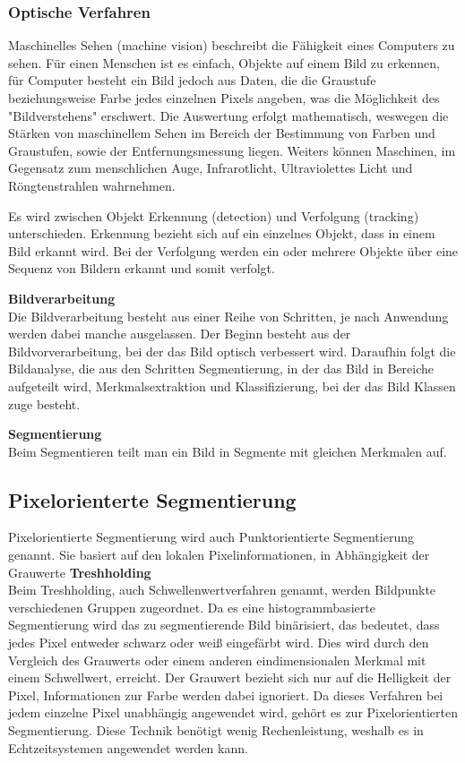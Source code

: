     \subsubsection{Optische Verfahren}
    Maschinelles Sehen (machine vision) beschreibt die Fähigkeit eines Computers zu sehen. 
    Für einen Menschen ist es einfach, Objekte auf einem Bild zu erkennen, für Computer besteht ein Bild jedoch aus Daten, die die Graustufe beziehungsweise Farbe jedes einzelnen Pixels angeben, was die Möglichkeit des "Bildverstehens" erschwert.
    Die Auswertung erfolgt mathematisch, weswegen die Stärken von maschinellem Sehen im Bereich der Bestimmung von Farben und Graustufen, sowie der Entfernungsmessung liegen. Weiters können Maschinen, im Gegensatz zum menschlichen Auge, Infrarotlicht, Ultraviolettes Licht und Röngtenstrahlen wahrnehmen. \cite{machinevision} \cite{machinevision2}

    Es wird zwischen Objekt Erkennung (detection) und Verfolgung (tracking) unterschieden. Erkennung bezieht sich auf ein einzelnes Objekt, dass in einem Bild erkannt wird. Bei der Verfolgung werden ein oder mehrere Objekte über eine Sequenz von Bildern erkannt und somit verfolgt.
    \cite{obj_det_trak}

    \textbf{Bildverarbeitung}\\ 
    Die Bildverarbeitung besteht aus einer Reihe von Schritten, je nach Anwendung werden dabei manche ausgelassen.
    Der Beginn besteht aus der Bildvorverarbeitung, bei der das Bild optisch verbessert wird. Daraufhin folgt die Bildanalyse, die aus den Schritten Segmentierung, in der das Bild in Bereiche aufgeteilt wird, Merkmalsextraktion und Klassifizierung, bei der das Bild Klassen zuge besteht. \cite{Bildverarbeitung} \cite{Bildverarbeitung2}

    \textbf{Segmentierung}\\
    Beim Segmentieren teilt man ein Bild in Segmente mit gleichen Merkmalen auf.

    \subsection*{Pixelorienterte Segmentierung} 
    Pixelorientierte Segmentierung wird auch Punktorientierte Segmentierung genannt. Sie basiert auf den lokalen Pixelinformationen, in Abhängigkeit der Grauwerte \cite{Seg_punkt}
    \textbf{Treshholding}\\ 
    Beim Treshholding, auch Schwellenwertverfahren genannt, werden Bildpunkte verschiedenen Gruppen zugeordnet. Da es eine histogrammbasierte Segmentierung wird das zu segmentierende Bild binärisiert, das bedeutet, dass jedes Pixel entweder schwarz oder weiß eingefärbt wird. Dies wird durch den Vergleich des Grauwerts oder einem anderen eindimensionalen Merkmal mit einem Schwellwert, erreicht. Der Grauwert bezieht sich nur auf die Helligkeit der Pixel, Informationen zur Farbe werden dabei ignoriert. Da dieses Verfahren bei jedem einzelne Pixel unabhängig angewendet wird, gehört es zur Pixelorientierten Segmentierung. Diese Technik benötigt wenig Rechenleistung, weshalb es in Echtzeitsystemen angewendet werden kann.


